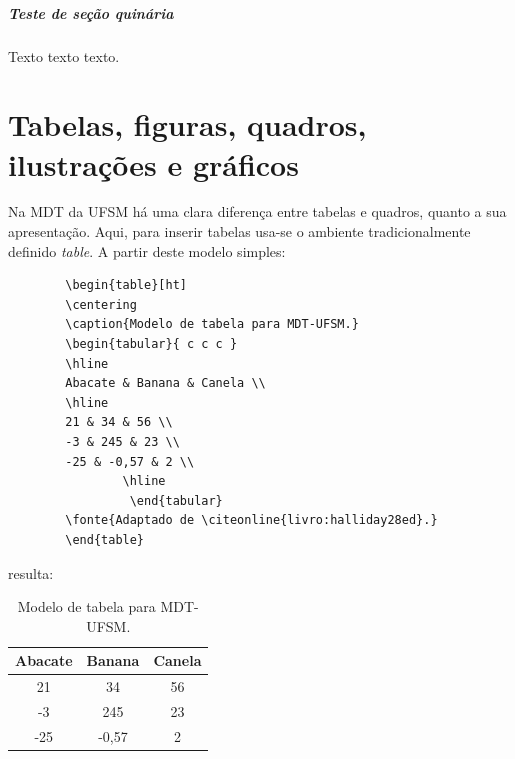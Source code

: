 \documentclass[oneside,openright,12pt]{ufsm_2021} %
\begin{document}
       \paragraph{Teste de seção quinária}
       
       \par Texto texto texto.
       
       
         \chapter{Tabelas, figuras, quadros, ilustrações e gráficos}
         
         \par Na MDT da UFSM há uma clara diferença entre tabelas e quadros, quanto a sua apresentação. Aqui, para inserir tabelas usa-se o ambiente tradicionalmente definido \textit{table}. A partir deste modelo simples:
        
         \begin{verbatim}
		\begin{table}[ht]
		\centering
		\caption{Modelo de tabela para MDT-UFSM.}
		\begin{tabular}{ c c c }
		\hline
		Abacate & Banana & Canela \\
		\hline
		21 & 34 & 56 \\
		-3 & 245 & 23 \\
		-25 & -0,57 & 2 \\
                \hline
                 \end{tabular}
		\fonte{Adaptado de \citeonline{livro:halliday28ed}.}
		\end{table}
	  \end{verbatim}
         
         \noindent resulta:
         
         \begin{table}[ht]
         \centering
         \caption{Modelo de tabela para MDT-UFSM.}
         \begin{tabular}{ c c c }
         \hline
         Abacate & Banana & Canela \\
         \hline
         21 & 34 & 56 \\
         -3 & 245 & 23 \\
         -25 & -0,57 & 2 \\
         \hline
         \end{tabular}
         \end{table}
         
\end{document}

